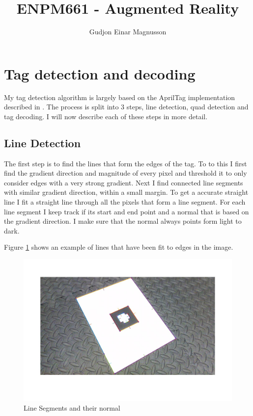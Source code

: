 \documentclass[12pt]{article}
\begin{document}
\title{ENPM661 - Augmented Reality}
\author{Gudjon Einar Magnusson}

\maketitle

\section{Tag detection and decoding}

My tag detection algorithm is largely based on the AprilTag implementation described in \cite{apriltag}. The process is split into 3 steps, line detection, quad detection and tag decoding. I will now describe each of these steps in more detail.

\subsection{Line Detection}

The first step is to find the lines that form the edges of the tag. To to this I first find the gradient direction and magnitude of every pixel and threshold it to only consider edges with a very strong gradient. Next I find connected line segments with similar gradient direction, within a small margin. To get a accurate straight line I fit a straight line through all the pixels that form a line segment. For each line segment I keep track if its start and end point and a normal that is based on the gradient direction. I make sure that the normal always points form light to dark.

Figure \ref{fig_lines} shows an example of lines that have been fit to edges in the image.

\begin{figure}
    \center
    \includegraphics[width=\linewidth]{img/Lines}
    \caption{Line Segments and their normal}
    \label{fig_lines}
\end{figure}
\end{document}
